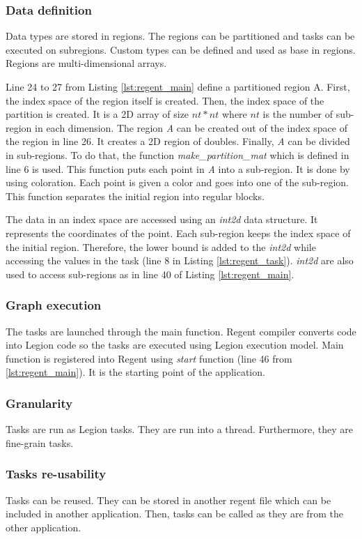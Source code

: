 \subsubsection{Data definition}
Data types are stored in regions.
The regions can be partitioned and tasks can be executed on subregions.
Custom types can be defined and used as base in regions.
Regions are multi-dimensional arrays.

Line 24 to 27 from Listing \ref{lst:regent_main} define a partitioned region A.
First, the index space of the region itself is created.
Then, the index space of the partition is created.
It is a 2D array of size $nt * nt$ where $nt$ is the number of sub-region in each dimension.
The region \textit{A} can be created out of the index space of the region in line 26.
It creates a 2D region of doubles.
Finally, \textit{A} can be divided in sub-regions.
To do that, the function \textit{make\_partition\_mat} which is defined in line 6 is used.
This function puts each point in \textit{A} into a sub-region.
It is done by using coloration.
Each point is given a color and goes into one of the sub-region.
This function separates the initial region into regular blocks.

The data in an index space are accessed using an \textit{int2d} data structure.
It represents the coordinates of the point.
Each sub-region keeps the index space of the initial region.
Therefore, the lower bound is added to the \textit{int2d} while accessing the values in the task (line 8 in Listing \ref{lst:regent_task}).
\textit{int2d} are also used to access sub-regions as in line 40 of Listing \ref{lst:regent_main}.


\subsubsection{Graph execution}
The tasks are launched through the main function.
Regent compiler converts code into Legion code so the tasks are executed using Legion execution model.
Main function is registered into Regent using \textit{start} function (line 46 from \ref{lst:regent_main}).
It is the starting point of the application.


\subsubsection{Granularity}
Tasks are run as Legion tasks.
They are run into a thread.
Furthermore, they are fine-grain tasks.

\subsubsection{Tasks re-usability}
Tasks can be reused.
They can be stored in another regent file which can be included in another application.
Then, tasks can be called as they are from the other application.

